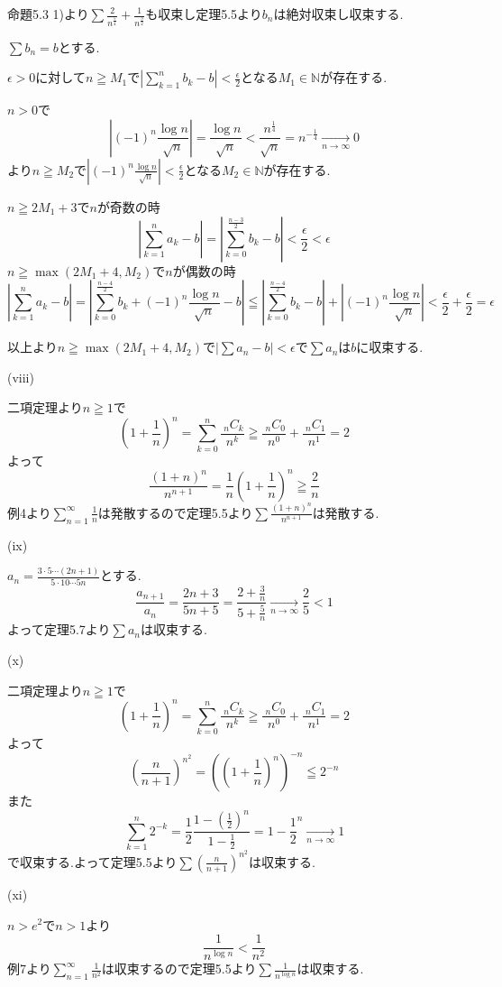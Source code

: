 \documentclass{jsarticle}
\begin{document}
命題5.3 1)より$\sum \frac{2}{n^\frac{5}{4}}+\frac{1}{n^\frac{3}{2}}$も収束し定理5.5より$b_n$は絶対収束し収束する.

$\sum b_n = b$とする.

$\epsilon > 0$に対して$n\geqq M_1$で$\displaystyle|\sum_{k=1}^nb_k-b|<\frac{\epsilon}{2}$となる$M_1\in\mathbb{N}$が存在する.

$n>0$で
\[|(-1)^n\frac{\log n}{\sqrt{n}}| = \frac{\log n}{\sqrt{n}} < \frac{n^{\frac{1}{4}}}{\sqrt{n}}=n^{-\frac{1}{4}}\xrightarrow[n\to \infty]{}0\]
より$n\geqq M_2$で$|(-1)^n\frac{\log n}{\sqrt{n}}|<\frac{\epsilon}{2}$となる$M_2\in\mathbb{N}$が存在する.

$n\geqq 2M_1+3$で$n$が奇数の時
\[|\sum_{k=1}^na_k - b|=|\sum_{k=0}^{\frac{n-3}{2}}b_k - b| < \frac{\epsilon}{2}<\epsilon\]
$n\geqq \max(2M_1+4,M_2)$で$n$が偶数の時
\[|\sum_{k=1}^na_k - b|=|\sum_{k=0}^{\frac{n-4}{2}}b_k + (-1)^n\frac{\log n}{\sqrt{n}}- b| \leqq |\sum_{k=0}^{\frac{n-4}{2}}b_k- b|+|(-1)^n\frac{\log n}{\sqrt{n}}| <\frac{\epsilon}{2}+\frac{\epsilon}{2} = \epsilon\]

以上より$n \geqq \max(2M_1+4,M_2)$で$|\sum a_n - b|<\epsilon$で$\sum a_n$は$b$に収束する.

(viii)

二項定理より$n \geqq 1$で
\[(1+\frac{1}{n})^n =\sum_{k=0}^n\frac{\ _nC_k}{n^k} \geqq \frac{\ _nC_0}{n^0}+\frac{\ _nC_1}{n^1} = 2\]
よって
\[\frac{(1+n)^n}{n^{n+1}} = \frac{1}{n}(1+\frac{1}{n})^n \geqq \frac{2}{n}\]
例4より$\displaystyle \sum_{n=1}^\infty \frac{1}{n}$は発散するので定理5.5より$\sum \frac{(1+n)^n}{n^{n+1}}$は発散する.

(ix)

$a_n=\frac{3\cdot 5\cdots (2n+1)}{5\cdot 10\cdots 5n}$とする.
\[\frac{a_{n+1}}{a_n}=\frac{2n+3}{5n+5}=\frac{2+\frac{3}{n}}{5+\frac{5}{n}}\xrightarrow[n\to\infty]{}\frac{2}{5}<1\]
よって定理5.7より$\sum a_n$は収束する.

(x)

二項定理より$n \geqq 1$で
\[(1+\frac{1}{n})^n =\sum_{k=0}^n\frac{\ _nC_k}{n^k} \geqq \frac{\ _nC_0}{n^0}+\frac{\ _nC_1}{n^1} = 2\]
よって
\[(\frac{n}{n+1})^{n^2}=((1+\frac{1}{n})^n)^{-n}\leqq 2^{-n}\]
また
\[\sum_{k=1}^n 2^{-k}=\frac{1}{2}\frac{1-(\frac{1}{2})^n}{1-\frac{1}{2}} =1-\frac{1}{2}^{n}\xrightarrow[n\to\infty]{}1\]
で収束する.よって定理5.5より$\sum (\frac{n}{n+1})^{n^2}$は収束する.

(xi)

$n>e^2$で$n>1$より
\[\frac{1}{n^{\log n}} < \frac{1}{n^2}\]
例7より$\displaystyle \sum_{n=1}^\infty \frac{1}{n^2}$は収束するので定理5.5より$\sum \frac{1}{n^{\log n}}$は収束する.
\end{document}
